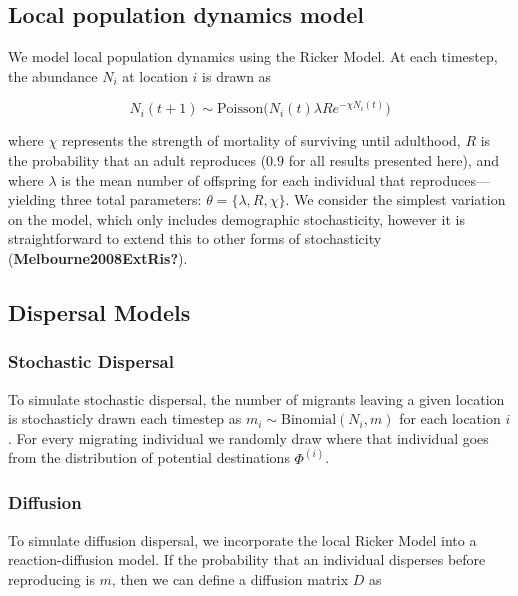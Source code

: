 \documentclass[10pt,oneside]{article}
\begin{document}
\hypertarget{local-population-dynamics-model}{%
\subsection{Local population dynamics
model}\label{local-population-dynamics-model}}

We model local population dynamics using the Ricker Model. At each
timestep, the abundance \(N_i\) at location \(i\) is drawn as

\[N_i(t+1) \sim \text{Poisson}\bigg(N_i(t) \lambda R e^{- \chi
N_i(t)}\bigg)\]

where \(\chi\) represents the strength of mortality of surviving until
adulthood, \(R\) is the probability that an adult reproduces (\(0.9\)
for all results presented here), and where \(\lambda\) is the mean
number of offspring for each individual that reproduces---yielding three
total parameters: \(\theta = \{\lambda, R, \chi \}\). We consider the
simplest variation on the model, which only includes demographic
stochasticity, however it is straightforward to extend this to other
forms of stochasticity (\textbf{Melbourne2008ExtRis?}).

\hypertarget{dispersal-models}{%
\subsection{Dispersal Models}\label{dispersal-models}}

\hypertarget{stochastic-dispersal}{%
\subsubsection{Stochastic Dispersal}\label{stochastic-dispersal}}

To simulate stochastic dispersal, the number of migrants leaving a given
location is stochasticly drawn each timestep as
\(m_{i} \sim \text{Binomial}(N_i, m)\) for each location \(i\). For
every migrating individual we randomly draw where that individual goes
from the distribution of potential destinations \(\Phi^{(i)}\).

\hypertarget{diffusion}{%
\subsubsection{Diffusion}\label{diffusion}}

To simulate diffusion dispersal, we incorporate the local Ricker Model
into a reaction-diffusion model. If the probability that an individual
disperses before reproducing is \(m\), then we can define a diffusion
matrix \(D\) as
\end{document}

